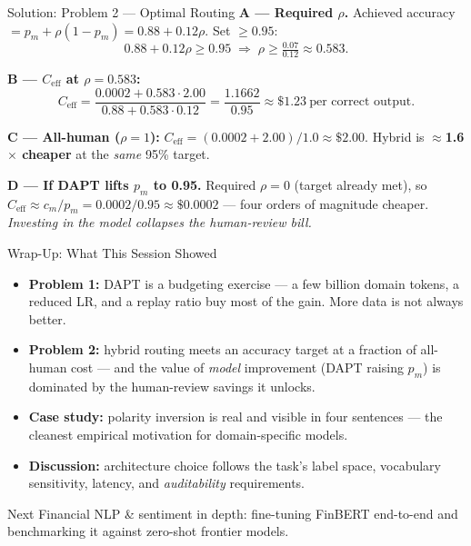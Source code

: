 \documentclass[9pt,t]{beamer}
\begin{document}
\begin{frame}{Solution: Problem 2 --- Optimal Routing}
\textbf{A --- Required $\rho$.} Achieved accuracy $= p_m + \rho(1-p_m) = 0.88 + 0.12\rho$.
Set $\ge 0.95$:
\[
  0.88 + 0.12\rho \ge 0.95 \;\Rightarrow\; \rho \ge \tfrac{0.07}{0.12} \approx \mathbf{0.583}.
\]

\textbf{B --- $C_{\text{eff}}$ at $\rho=0.583$:}
\[
  C_{\text{eff}} = \frac{0.0002 + 0.583\cdot 2.00}{0.88 + 0.583\cdot 0.12}
  = \frac{1.1662}{0.95} \approx \mathbf{\$1.23}\ \text{per correct output.}
\]

\textbf{C --- All-human ($\rho=1$):} $C_{\text{eff}} = (0.0002+2.00)/1.0 \approx \$2.00$.
Hybrid is $\approx$\textbf{1.6$\times$ cheaper} at the \emph{same} 95\% target.

\medskip
\textbf{D --- If DAPT lifts $p_m$ to 0.95.} Required $\rho = 0$ (target already met),
so $C_{\text{eff}} \approx c_m/p_m = 0.0002/0.95 \approx \$0.0002$ --- four orders of
magnitude cheaper. \emph{Investing in the model collapses the human-review bill.}
\end{frame}

\begin{frame}{Wrap-Up: What This Session Showed}
\begin{itemize}
  \item \textbf{Problem 1:} DAPT is a budgeting exercise --- a few billion domain
        tokens, a reduced LR, and a replay ratio buy most of the gain. More data is
        not always better.
  \item \textbf{Problem 2:} hybrid routing meets an accuracy target at a fraction of
        all-human cost --- and the value of \emph{model} improvement (DAPT raising
        $p_m$) is dominated by the human-review savings it unlocks.
  \item \textbf{Case study:} polarity inversion is real and visible in four sentences
        --- the cleanest empirical motivation for domain-specific models.
  \item \textbf{Discussion:} architecture choice follows the task's label space,
        vocabulary sensitivity, latency, and \emph{auditability} requirements.
\end{itemize}

\medskip
\begin{block}{Next}
Financial NLP \& sentiment in depth: fine-tuning FinBERT end-to-end and benchmarking
it against zero-shot frontier models.
\end{block}
\end{frame}
\end{document}

